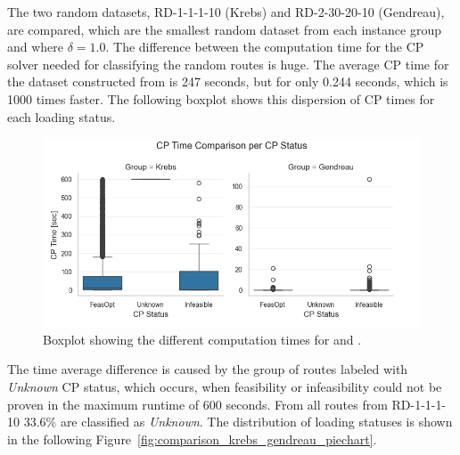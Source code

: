 The two random datasets, RD-1-1-1-10 (Krebs) and RD-2-30-20-10 (Gendreau), are compared, which are the smallest random dataset from each instance group and
where $\delta = 1.0$. The difference between the computation time for the \gls{CP} solver needed for classifying the random routes is huge. The average
\gls{CP} time for the dataset constructed from \krebsADataSetText is 247 seconds, but for \gendreauDataSetText only 0.244 seconds,
which is 1000 times faster. The following boxplot shows this dispersion of \gls{CP} times for each loading status.
\begin{figure}[ht]
	\centering
	\includegraphics[width=\textwidth]{pictures/comparison_krebs_gendreau/boxplot_cp_time.png}
	\caption{Boxplot showing the different computation times for \krebsADataSetText and \gendreauDataSet.}
	\label{fig:comparison_krebs_gendreau_boxplot}
\end{figure}

The time average difference is caused by the group of routes labeled with \textit{Unknown} \gls{CP} status, which occurs, when
feasibility or infeasibility could not be proven in the maximum runtime of 600 seconds. From all routes from RD-1-1-1-10
33.6\% are classified as \textit{Unknown}. The distribution of loading statuses is shown in the following Figure~\ref{fig:comparison_krebs_gendreau_piechart}.

